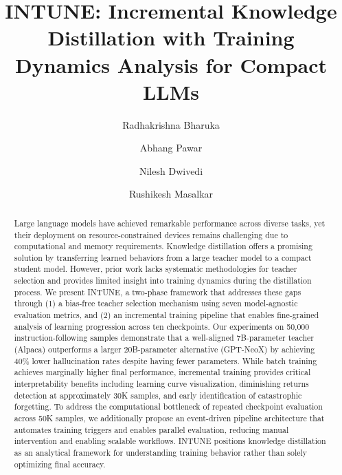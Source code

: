 \documentclass[sigconf]{acmart}
\begin{document}
\raggedbottom

\title{INTUNE: Incremental Knowledge Distillation with Training Dynamics Analysis for Compact LLMs}

\author{Radhakrishna Bharuka}
\affiliation{\institution{}}

\author{Abhang Pawar}
\affiliation{\institution{}}

\author{Nilesh Dwivedi}
\affiliation{\institution{}}

\author{Rushikesh Masalkar}
\affiliation{\institution{}}

\begin{abstract}
Large language models have achieved remarkable performance across diverse tasks, yet their deployment on resource-constrained devices remains challenging due to computational and memory requirements. Knowledge distillation offers a promising solution by transferring learned behaviors from a large teacher model to a compact student model. However, prior work lacks systematic methodologies for teacher selection and provides limited insight into training dynamics during the distillation process. We present INTUNE, a two-phase framework that addresses these gaps through (1) a bias-free teacher selection mechanism using seven model-agnostic evaluation metrics, and (2) an incremental training pipeline that enables fine-grained analysis of learning progression across ten checkpoints. Our experiments on 50,000 instruction-following samples demonstrate that a well-aligned 7B-parameter teacher (Alpaca) outperforms a larger 20B-parameter alternative (GPT-NeoX) by achieving 40\% lower hallucination rates despite having fewer parameters. While batch training achieves marginally higher final performance, incremental training provides critical interpretability benefits including learning curve visualization, diminishing returns detection at approximately 30K samples, and early identification of catastrophic forgetting. To address the computational bottleneck of repeated checkpoint evaluation across 50K samples, we additionally propose an event-driven pipeline architecture that automates training triggers and enables parallel evaluation, reducing manual intervention and enabling scalable workflows. INTUNE positions knowledge distillation as an analytical framework for understanding training behavior rather than solely optimizing final accuracy.
\end{abstract}
\end{document}

